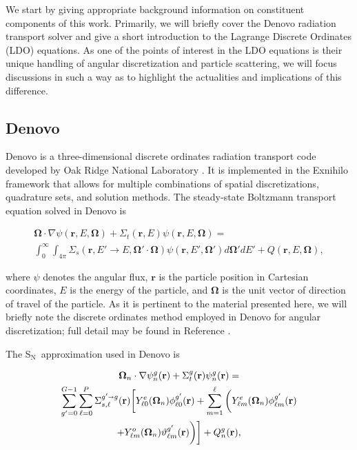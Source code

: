 \documentclass{article} %
\newcommand{\sa}{\shortrightarrow}
\newcommand{\bo}{\mathbf\Omega}
\newcommand{\vecr}{\textbf{r}}
\newcommand{\sn}{S$_\mathrm{N}$}
\newcommand{\Ye}[2]{\ensuremath{Y^e_{#1}(\bo_#2)}}
\newcommand{\Yo}[2]{\ensuremath{Y^o_{#1}(\bo_#2)}}
\begin{document}
We start by giving appropriate background information on constituent components
of this work. Primarily, we will briefly cover the Denovo radiation transport
solver and give a short introduction to the Lagrange Discrete Ordinates (LDO)
equations. As one of the points of interest in the LDO equations is their
unique handling of angular discretization and particle scattering, we will
focus discussions in such a way as to highlight the actualities and
implications of this difference.

\subsection{Denovo}

Denovo is a three-dimensional discrete ordinates radiation transport code
developed by Oak Ridge National Laboratory \cite{denovo}. It is implemented in
the Exnihilo framework that allows for multiple combinations of spatial
discretizations, quadrature sets, and solution methods. The steady-state
Boltzmann transport equation solved in Denovo is

\begin{multline}
\bo \cdot \nabla \psi(\vecr,E,\bo) + \Sigma_t(\vecr,E) \psi(\vecr,E,\bo) = \\
\int_0^\infty\int_{4\pi} \Sigma_s(\vecr,E'\rightarrow E,\bo'\cdot\bo)
\psi(\vecr,E',\bo')d\bo'dE' + Q(\vecr,E,\bo),
\label{eq:bte}
\end{multline}

\noindent where $\psi$ denotes the angular flux, $\vecr$ is the particle
position in Cartesian coordinates, $E$ is the energy of the particle,
and $\bo$ is the unit vector of direction of travel of the particle. As it is
pertinent to the material presented here, we will briefly note the discrete
ordinates method employed in Denovo for angular discretization; full detail may
be found in Reference \cite{denovo}.

The \sn\ approximation used in Denovo is

\begin{multline}
\bo_n \cdot \nabla \psi_n^g(\vecr) + \Sigma_t^g(\vecr)\psi_n^g(\vecr) = \\
\sum_{g'=0}^{G-1}\sum_{\ell=0}^{P}\Sigma_{s,\ell}^{g'\sa g}(\vecr)
\bigg[\Ye{\ell 0}{n}\phi_{\ell 0}^{g'}(\vecr) + \sum_{m=1}^{\ell}
\bigg(\Ye{\ell m}{n}\phi_{\ell m}^{g'}(\vecr) \\
 + \Yo{\ell m}{n}\vartheta_{\ell m}^{g'}(\vecr)\bigg)\bigg]
+ Q_n^g(\vecr),
\label{eq:sn}
\end{multline}
\end{document}
